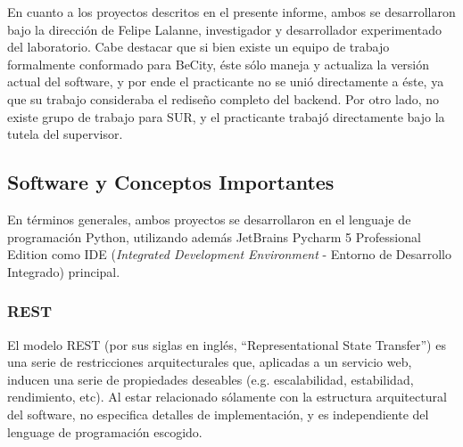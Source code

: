 \documentclass[11pt,letterpaper]{article}
\begin{document}
En cuanto a los proyectos descritos en el presente informe, ambos se desarrollaron bajo la dirección de Felipe Lalanne\cite{lalanne}, investigador y desarrollador experimentado del laboratorio. Cabe destacar que si bien existe un equipo de trabajo formalmente conformado para BeCity, éste sólo maneja y actualiza la versión actual del software, y por ende el practicante no se unió directamente a éste, ya que su trabajo consideraba el rediseño completo del backend.
Por otro lado, no existe grupo de trabajo para SUR, y el practicante trabajó directamente bajo la tutela del supervisor.
\newpage
\subsection{Software y Conceptos Importantes}
En términos generales, ambos proyectos se desarrollaron en el lenguaje de programación Python\cite{python}, utilizando además JetBrains Pycharm 5 Professional Edition\cite{pycharm} como IDE (\emph{Integrated Development Environment} - Entorno de Desarrollo Integrado) principal.

\subsubsection{REST}

El modelo REST\cite{rest} (por sus siglas en inglés, ``Representational State Transfer'') es una serie de restricciones arquitecturales que, aplicadas a un servicio web, inducen una serie de propiedades deseables (e.g. escalabilidad, estabilidad, rendimiento, etc). Al estar relacionado sólamente con la estructura arquitectural del software, no especifica detalles de implementación, y es independiente del lenguage de programación escogido.\\
\end{document}
